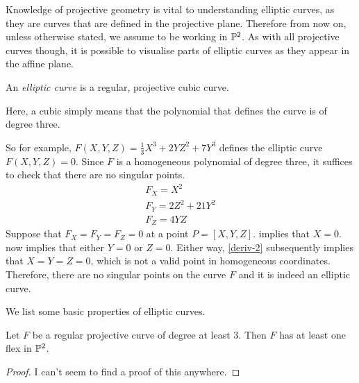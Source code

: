 Knowledge of projective geometry is vital to understanding elliptic curves, as they are curves that are defined in the projective plane.
Therefore from now on, unless otherwise stated, we assume to be working in $\pn[2]$.
As with all projective curves though, it is possible to visualise parts of elliptic curves as they appear in the affine plane.
\begin{definition}
	An \emph{elliptic curve} is a regular, projective cubic curve.
\end{definition}
Here, a cubic simply means that the polynomial that defines the curve is of degree three.

So for example, $F(X,Y,Z) = \frac{1}{3}X^3 + 2YZ^2 + 7Y^3$ defines the elliptic curve $F(X,Y,Z) = 0$.
Since $F$ is a homogeneous polynomial of degree three, it suffices to check that there are no singular points.
\begin{align}
	F_X = X^2 \label{deriv-1}\\
	F_Y = 2Z^2 + 21Y^2 \label{deriv-2}\\
	F_Z = 4YZ \label{deriv-3}
\end{align}
Suppose that $F_X = F_Y = F_Z = 0$ at a point $P = [X,Y,Z]$.
 implies that $X=0$.
 now implies that either $Y=0$ or $Z=0$.
Either way, \cref{deriv-2} subsequently implies that $X = Y = Z = 0$, which is not a valid point in homogeneous coordinates.
Therefore, there are no singular points on the curve $F$ and it is indeed an elliptic curve.

We list some basic properties of elliptic curves.
\begin{theorem}
	Let $F$ be a regular projective curve of degree at least 3. Then $F$ has at least one flex in $\pn[2]$.
\end{theorem}
\begin{proof}
	I can't seem to find a proof of this anywhere. %
\end{proof}
